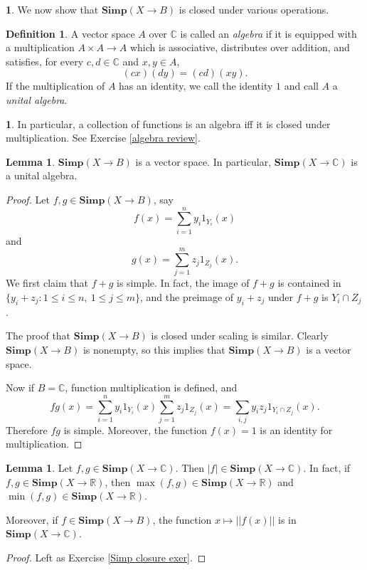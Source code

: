 \documentclass[12pt]{book}
\newcommand{\RR}{\mathbb{R}}
\newcommand{\CC}{\mathbb{C}}
\newcommand{\Simp}{\mathbf{Simp}}
\newcommand{\dfn}[1]{\emph{#1}\index{#1}}
\theoremstyle{definition}
\newtheorem{lemma}[theorem]{Lemma}
\newtheorem{subsec}[theorem]{}
\newtheorem{definition}[theorem]{Definition}
\begin{document}
\begin{subsec}
We now show that $\Simp(X \to B)$ is closed under various operations.
\end{subsec}

\begin{definition}
A vector space $A$ over $\CC$ is called an \dfn{algebra} if it is equipped with a multiplication $A \times A \to A$ which is associative, distributes over addition, and satisfies, for every $c,d \in \CC$ and $x,y \in A$,
$$(cx)(dy) = (cd)(xy).$$
If the multiplication of $A$ has an identity, we call the identity $1$ and call $A$ a \dfn{unital algebra}.
\end{definition}

\begin{subsec}
In particular, a collection of functions is an algebra iff it is closed under multiplication.
See Exercise \ref{algebra review}.
\end{subsec}

\begin{lemma}
\label{Simp is an algebra}
$\Simp(X \to B)$ is a vector space. In particular, $\Simp(X \to \CC)$ is a unital algebra.
\end{lemma}
\begin{proof}
Let $f, g \in \Simp(X \to B)$, say
$$f(x) = \sum_{i=1}^n y_i1_{Y_i}(x)$$
and
$$g(x) = \sum_{j=1}^m z_j1_{Z_j}(x).$$
We first claim that $f + g$ is simple. In fact, the image of $f + g$ is contained in $\{y_i + z_j: 1 \leq i \leq n, ~1 \leq j \leq m\}$, and the preimage of $y_i + z_j$ under $f + g$ is $Y_i \cap Z_j$.

The proof that $\Simp(X \to B)$ is closed under scaling is similar. Clearly $\Simp(X \to B)$ is nonempty, so this implies that $\Simp(X \to B)$ is a vector space.

Now if $B = \CC$, function multiplication is defined, and
$$fg(x) = \sum_{i=1}^n y_i1_{Y_i}(x)\sum_{j=1}^m z_j1_{Z_j}(x) = \sum_{i,j} y_iz_j 1_{Y_i \cap Z_j}(x).$$
Therefore $fg$ is simple.
Moreover, the function $f(x) = 1$ is an identity for multiplication.
\end{proof}

\begin{lemma}
\label{Simp is closed under minmax}
Let $f, g \in \Simp(X \to \CC)$. Then $|f| \in \Simp(X \to \CC)$. In fact, if $f, g \in \Simp(X \to \RR)$, then $\max(f, g) \in \Simp(X \to \RR)$ and $\min(f, g) \in \Simp(X \to \RR)$.

Moreover, if $f \in \Simp(X \to B)$, the function $x \mapsto ||f(x)||$ is in $\Simp(X \to \CC)$.
\end{lemma}
\begin{proof}
Left as Exercise \ref{Simp closure exer}.
\end{proof}
\end{document}
